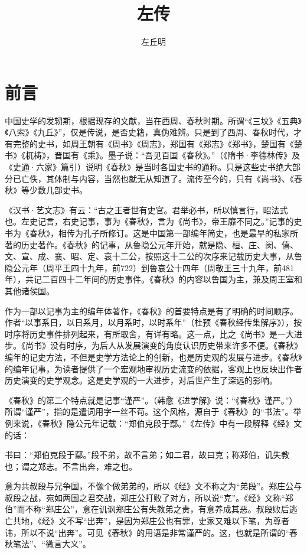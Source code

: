 \documentclass[a4paper,12pt,UTF8,twoside]{ctexbook}
\title{\heiti\zihao{0} 左传}
\author{左丘明}
\date{}
\begin{document}
\maketitle
\tableofcontents

\frontmatter
\chapter{前言}

中国史学的发轫期，根据现存的文献，当在西周、春秋时期。所谓“《三坟》《五典》《八索》《九丘》”，仅是传说，是否史籍，真伪难辨。只是到了西周、春秋时代，才有完整的史书，如周王朝有《周书》《周志》，郑国有《郑志》《郑书》，楚国有《楚书》《杌梼》，晋国有《乘》。墨子说：“吾见百国《春秋》。”（《隋书·李德林传》及《史通·六家》篇引）说明《春秋》是当时各国史书的通称。只是这些史书绝大部分已亡佚，其体制与内容，当然也就无从知道了。流传至今的，只有《尚书》、《春秋》等少数几部史书。

《汉书·艺文志》有云：“古之王者世有史官。君举必书，所以慎言行，昭法式也。左史记言，右史记事，事为《春秋》，言为《尚书》，帝王靡不同之。”记事的史书为《春秋》，相传为孔子所修订。这是中国第一部编年简史，也是最早的私家所著的历史著作。《春秋》的记事，从鲁隐公元年开始，就是隐、桓、庄、闵、僖、文、宣、成、襄、昭、定、哀十二公，按照这十二公的次序来记载历史大事，从鲁隐公元年（周平王四十九年，前722）到鲁哀公十四年（周敬王三十九年，前481年），共记二百四十二年间的历史事件。《春秋》的内容以鲁国为主，兼及周王室和其他诸侯国。

作为一部以记事为主的编年体著作，《春秋》的首要特点是有了明确的时间顺序。作者“以事系日，以日系月，以月系时，以时系年”（杜预《春秋经传集解序》），按时序将历史事件排列起来，有所取舍，有详有略。这一点，比之《尚书》是一大进步。《尚书》没有时序，为后人从发展演变的角度认识历史带来许多不便。《春秋》编年的记史方法，不但是史学方法论上的创新，也是历史观的发展与进步。《春秋》的编年记事，为读者提供了一个宏观地审视历史流变的依据，客观上也反映出作者历史演变的史学观念。这是史学观的一大进步，对后世产生了深远的影响。

《春秋》的第二个特点就是记事“谨严”。（韩愈《进学解》说：“《春秋》谨严。”）所谓“谨严”，指的是遣词用字一丝不苟。这个风格，源自于《春秋》的“书法”。举例来说，《春秋》隐公元年记载：“郑伯克段于鄢。”《左传》中有一段解释《经》文的话：

书曰：“郑伯克段于鄢。”段不弟，故不言弟；如二君，故曰克；称郑伯，讥失教也；谓之郑志。不言出奔，难之也。

意为共叔段与兄争国，不像个做弟弟的，所以《经》文不称之为“弟段”。郑庄公与叔段之战，宛如两国之君交战，郑庄公打败了对方，所以说“克”。《经》文称“郑伯”而不称“郑庄公”，意在讥讽郑庄公有失教弟之责，有意养成其恶。叔段败后逃亡共地，《经》文不写“出奔”，是因为郑庄公也有罪，史家又难以下笔，为尊者讳，所以不说“出奔”。可见《春秋》的用语是非常谨严的。这，也就是所谓的“春秋笔法”、“微言大义”。
\end{document}
